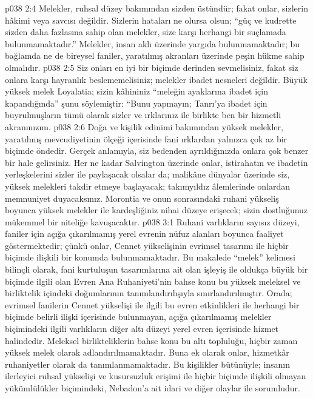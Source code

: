 \vs p038 2:4 Melekler, ruhsal düzey bakımından sizden üstündür; fakat onlar, sizlerin hâkimi veya savcısı değildir. Sizlerin hataları ne olursa olsun; “güç ve kudrette sizden daha fazlasına sahip olan melekler, size karşı herhangi bir suçlamada bulunmamaktadır.” Melekler, insan aklı üzerinde yargıda bulunmamaktadır; bu bağlamda ne de bireysel faniler, yaratılmış akranları üzerinde peşin hükme sahip olmalıdır.
\vs p038 2:5 Siz onları en iyi bir biçimde derinden sevmelisiniz, fakat siz onlara karşı hayranlık beslememelisiniz; melekler ibadet nesneleri değildir. Büyük yüksek melek Loyalatia; sizin kâhininiz “meleğin ayaklarına ibadet için kapandığında” şunu söylemiştir: “Bunu yapmayın; Tanrı’ya ibadet için buyrulmuşların tümü olarak sizler ve ırklarınız ile birlikte ben bir hizmetli akranınızım.
\vs p038 2:6 Doğa ve kişilik edinimi bakımından yüksek melekler, yaratılmış mevcudiyetinin ölçeği içerisinde fani ırklardan yalnızca çok az bir biçimde öndedir. Gerçek anlamıyla, siz bedenden ayrıldığınızda onlara çok benzer bir hale gelirsiniz. Her ne kadar Salvington üzerinde onlar, istirahatın ve ibadetin yerleşkelerini sizler ile paylaşacak olsalar da; malikâne dünyalar üzerinde siz, yüksek melekleri takdir etmeye başlayacak; takımyıldız âlemlerinde onlardan memnuniyet duyacaksınız. Morontia ve onun sonrasındaki ruhani yükseliş boyunca yüksek melekler ile kardeşliğiniz nihai düzeye erişecek; sizin dostluğunuz mükemmel bir niteliğe kavuşacaktır.
\vs p038 3:1 Ruhani varlıkların sayısız düzeyi, faniler için açığa çıkarılmamış yerel evrenin nüfuz alanları boyunca faaliyet göstermektedir; çünkü onlar, Cennet yükselişinin evrimsel tasarımı ile hiçbir biçimde ilişkili bir konumda bulunmamaktadır. Bu makalede “melek” kelimesi bilinçli olarak, fani kurtuluşun tasarımlarına ait olan işleyiş ile oldukça büyük bir biçimde ilgili olan Evren Ana Ruhaniyeti’nin bahse konu bu yüksek meleksel ve birliktelik içindeki doğumlarının tanımlandırılışıyla sınırlandırılmıştır. Orada; evrimsel fanilerin Cennet yükselişi ile ilgili bu evren etkinlikleri ile herhangi bir biçimde belirli ilişki içerisinde bulunmayan, açığa çıkarılmamış melekler biçimindeki ilgili varlıkların diğer altı düzeyi yerel evren içerisinde hizmet halindedir. Meleksel birlikteliklerin bahse konu bu altı topluluğu, hiçbir zaman yüksek melek olarak adlandırılmamaktadır. Buna ek olarak onlar, hizmetkâr ruhaniyetler olarak da tanımlanmamaktadır. Bu kişilikler bütünüyle; insanın ilerleyici ruhsal yükselişi ve kusursuzluk erişimi ile hiçbir biçimde ilişkili olmayan yükümlülükler biçimindeki, Nebadon’a ait idari ve diğer olaylar ile sorumludur.
